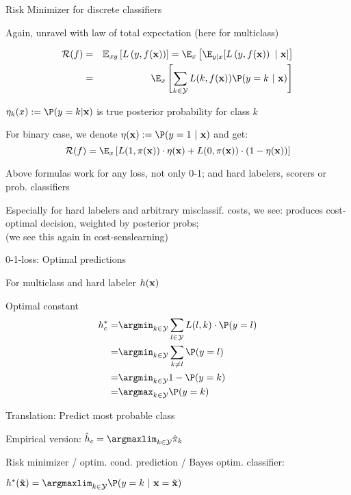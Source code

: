 \documentclass[11pt,compress,t,notes=noshow, xcolor=table]{beamer}
\begin{document}
\begin{framei}[sep=M]{Risk Minimizer for discrete classifiers}

\item Again, unravel with law of total expectation (here for multiclass)

\vspace*{-0.5cm}

\begin{eqnarray*}
\riskf  & = & \Exy\left[\Lxy\right] = \E_x \left[ \E_{y|x} [ \Lxy ~|~ \xv ] \right] \\
      & = & \E_x \left[\sum_{k \in \Yspace} L(k, \fx) \P(y = k~|~ \xv)\right] 
\end{eqnarray*}

\item $\eta_k(x) := \P(y = k| \xv)$ is true posterior probability for class $k$

\item For binary case, we denote $\eta(\xv) := \P(y = 1 ~|~ \xv)$ and get: 
$$
\riskf = \E_x \left[L(1, \pix) \cdot \eta(\xv) + L(0, \pix) \cdot (1 - \eta(\xv)) \right]
$$

\item Above formulas work for any loss, not only 0-1; and hard labelers, scorers or prob. classifiers

\item Especially for hard labelers and arbitrary misclassif. costs, we see: produces cost-optimal decision, weighted by posterior probs; \\
(we see this again in cost-senslearning)


\end{framei}


\begin{framei}[sep=M]{0-1-loss: Optimal predictions}

\item For multiclass and hard labeler $h(\mathbf{x})$
\item Optimal constant
\begin{align*}   h_{c}^{\ast}  =& \argmin_{k \in \Yspace} \sum_{l \in \Yspace} L(l, k) \cdot \P(y = l) \\
=& \argmin_{k \in \Yspace} \sum_{k \ne l} \P(y = l) \\ 
=& \argmin_{k \in \Yspace} 1 - \P(y = k) \\
=& \argmax_{k \in \Yspace} \P(y = k)
\end{align*}


\item Translation: Predict most probable class

\item Empirical version: $\hat{h}_c = \argmaxlim_{k \in \Yspace} \pikh$

\item Risk minimizer / optim. cond. prediction / Bayes optim. classifier:

$h^{\ast}(\xtil) = \argmaxlim_{k \in \Yspace} \P(y = k~|~ \xv = \xtil)$ 

\end{framei}
\end{document}
